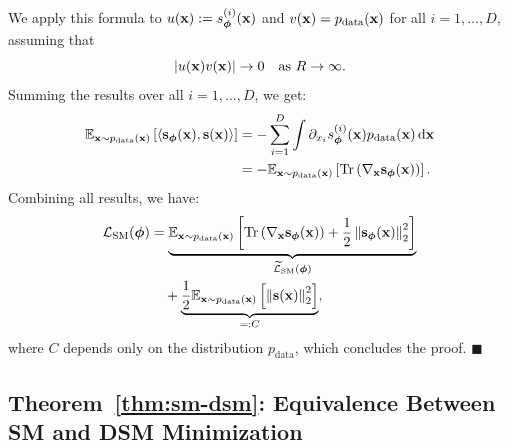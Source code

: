         We apply this formula to $u({\mathbf{x}}) := s_{\bm{\phi}}^{(i)}({\mathbf{x}})$ and $v({\mathbf{x}}) = p_{\text{data}}({\mathbf{x}})$ for all $i = 1, \dots, D$, assuming that
        \[
        |u({\mathbf{x}}) v({\mathbf{x}})| \to 0 \quad \text{as } R \to \infty.
        \]
        Summing the results over all $i = 1, \dots, D$, we get:
        \begin{align*}
            \mathbb{E}_{{\mathbf{x}} \sim p_{\text{data}}({\mathbf{x}})} \left[ \langle {\mathbf{s}}_{\bm{\phi}}({\mathbf{x}}), {\mathbf{s}}({\mathbf{x}}) \rangle \right] 
             &= - \sum_{i=1}^{D} \int  \partial_{x_i}s_{\bm{\phi}}^{(i)}({\mathbf{x}}) p_{\text{data}}({\mathbf{x}}) \mathop{}\!\mathrm{d} {\mathbf{x}} \\
             &= - \mathbb{E}_{{\mathbf{x}} \sim p_{\text{data}}({\mathbf{x}})} \left[\operatorname{Tr}\left(\nabla_{{\mathbf{x}}}{\mathbf{s}}_{\bm{\phi}}({\mathbf{x}})\right) \right].
        \end{align*}
        Combining all results, we have:
        \begin{align*}
        \mathcal{L}_{\text{SM}}(\bm{\phi}) &= \underbrace{\mathbb{E}_{{\mathbf{x}} \sim p_{\text{data}}({\mathbf{x}})} \left[\operatorname{Tr}\left(\nabla_{{\mathbf{x}}}{\mathbf{s}}_{\bm{\phi}}({\mathbf{x}})\right) + \frac{1}{2}  \left\lVert{\mathbf{s}}_{\bm{\phi}}({\mathbf{x}})\right\rVert_2^2 \right]}_{\widetilde{\mathcal{L}}_{\text{SM}}(\bm{\phi})} \\
        &\quad + \underbrace{\frac{1}{2}\mathbb{E}_{{\mathbf{x}} \sim p_{\text{data}}({\mathbf{x}})} \left[ \left\lVert{\mathbf{s}}({\mathbf{x}})\right\rVert_2^2 \right]}_{=:C},
        \end{align*}
        where $C$ depends only on the distribution $p_{\text{data}}$, which concludes the proof.
\hfill$\blacksquare$

\subsection{Theorem~\ref{thm:sm-dsm}: Equivalence Between SM and DSM Minimization}\label{app-sec:sm-dsm}
